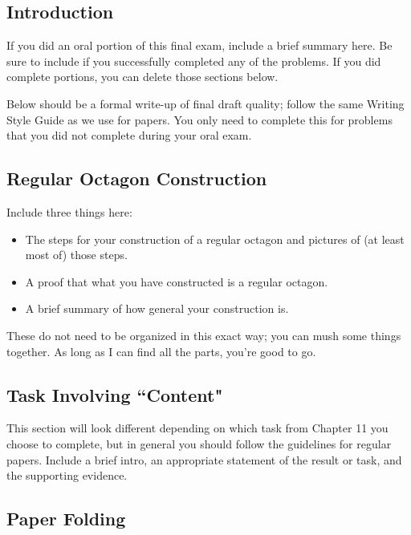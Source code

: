 \date{\today}



\maketitle


\subsection*{Introduction}
If you did an oral portion of this final exam, include a brief summary here.  Be sure to include if you successfully completed any of the problems.  If you did complete portions, you can delete those sections below.  

Below should be a formal write-up of final draft quality; follow the same Writing Style Guide as we use for papers.  You only need to complete this for problems that you did not complete during your oral exam.

\subsection*{Regular Octagon Construction}

Include three things here:
\begin{itemize}
\item  The steps for your construction of a regular octagon and pictures of (at least most of) those steps.
\item  A proof that what you have constructed is a regular octagon.
\item  A brief summary of how general your construction is.
\end{itemize}
These do not need to be organized in this exact way; you can mush some things together.  As long as I can find all the parts, you're good to go.

\subsection*{Task Involving ``Content"}
  
This section will look different depending on which task from Chapter 11 you choose to complete, but in general you should follow the guidelines for regular papers.  Include a brief intro, an appropriate statement of the result or task, and the supporting evidence.


\subsection*{Paper Folding}

